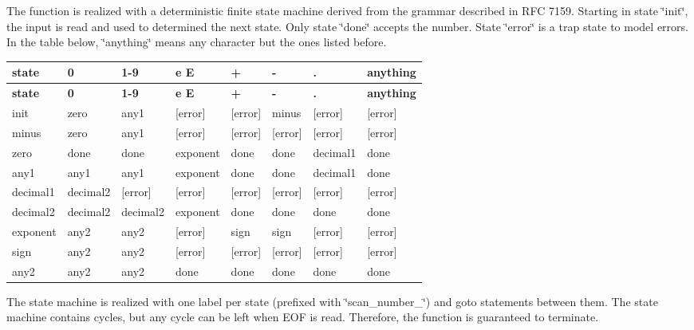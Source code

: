 The function is realized with a deterministic finite state machine derived from the grammar described in R\+FC 7159. Starting in state \char`\"{}init\char`\"{}, the input is read and used to determined the next state. Only state \char`\"{}done\char`\"{} accepts the number. State \char`\"{}error\char`\"{} is a trap state to model errors. In the table below, \char`\"{}anything\char`\"{} means any character but the ones listed before.

\tabulinesep=1mm
\begin{longtabu} spread 0pt [c]{*{8}{|X[-1]}|}
\hline
\rowcolor{\tableheadbgcolor}\textbf{ state }&\textbf{ 0 }&\textbf{ 1-\/9 }&\textbf{ e E }&\textbf{ + }&\textbf{ -\/ }&\textbf{ . }&\textbf{ anything  }\\
\endfirsthead
\hline
\endfoot
\hline
\rowcolor{\tableheadbgcolor}\textbf{ state }&\textbf{ 0 }&\textbf{ 1-\/9 }&\textbf{ e E }&\textbf{ + }&\textbf{ -\/ }&\textbf{ . }&\textbf{ anything  }\\
\endhead
init &zero &any1 &\mbox{[}error\mbox{]} &\mbox{[}error\mbox{]} &minus &\mbox{[}error\mbox{]} &\mbox{[}error\mbox{]} \\
minus &zero &any1 &\mbox{[}error\mbox{]} &\mbox{[}error\mbox{]} &\mbox{[}error\mbox{]} &\mbox{[}error\mbox{]} &\mbox{[}error\mbox{]} \\
zero &done &done &exponent &done &done &decimal1 &done \\
any1 &any1 &any1 &exponent &done &done &decimal1 &done \\
decimal1 &decimal2 &\mbox{[}error\mbox{]} &\mbox{[}error\mbox{]} &\mbox{[}error\mbox{]} &\mbox{[}error\mbox{]} &\mbox{[}error\mbox{]} &\mbox{[}error\mbox{]} \\
decimal2 &decimal2 &decimal2 &exponent &done &done &done &done \\
exponent &any2 &any2 &\mbox{[}error\mbox{]} &sign &sign &\mbox{[}error\mbox{]} &\mbox{[}error\mbox{]} \\
sign &any2 &any2 &\mbox{[}error\mbox{]} &\mbox{[}error\mbox{]} &\mbox{[}error\mbox{]} &\mbox{[}error\mbox{]} &\mbox{[}error\mbox{]} \\
any2 &any2 &any2 &done &done &done &done &done \\
\end{longtabu}
The state machine is realized with one label per state (prefixed with \char`\"{}scan\+\_\+number\+\_\+\char`\"{}) and {\ttfamily goto} statements between them. The state machine contains cycles, but any cycle can be left when E\+OF is read. Therefore, the function is guaranteed to terminate.

